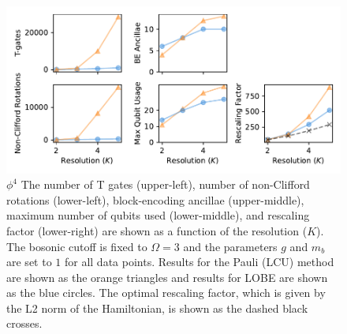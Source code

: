 \begin{figure}
    \label{fig:phi4}
    \includegraphics[width = 16cm]{figures/phi4-resolution.pdf}
    \caption{
        \textbf{$\phi^4$}
        The number of T gates (upper-left), number of non-Clifford rotations (lower-left), block-encoding ancillae (upper-middle), maximum number of qubits used (lower-middle), and rescaling factor (lower-right) are shown as a function of the resolution ($K$).
        The bosonic cutoff is fixed to $\Omega = 3$ and the parameters $g$ and $m_b$ are set to $1$ for all data points.
        Results for the Pauli (LCU) method are shown as the orange triangles and results for LOBE are shown as the blue circles.
        The optimal rescaling factor, which is given by the L2 norm of the Hamiltonian, is shown as the dashed black crosses.
    }
\end{figure}

